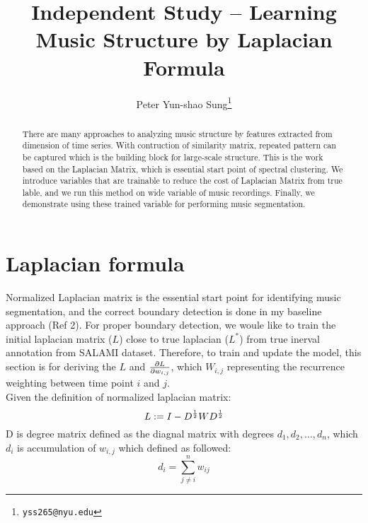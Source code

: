 \documentclass[final]{siamltexmm}
\title{Independent Study -- Learning Music Structure by Laplacian Formula}
\author{Peter Yun-shao Sung\thanks{\tt yss265@nyu.edu} }
\begin{document}
\maketitle

\begin{abstract}
There are many approaches to analyzing music structure by features extracted from dimension of time series. With contruction of similarity matrix, repeated pattern can be captured which is the building block for large-scale structure. This is the work based on the Laplacian Matrix, which is essential start point of spectral clustering. We introduce variables that are trainable to reduce the cost of Laplacian Matrix from true lable, and we run this method on wide variable of music recordings. Finally, we demonstrate using these trained variable for performing music segmentation.
\end{abstract}

\pagestyle{myheadings}
\thispagestyle{plain}
\section{Laplacian formula}
Normalized Laplacian matrix is the essential start point for identifying music segmentation, and the correct boundary detection is done in my baseline approach (Ref 2). For proper boundary detection, we woule like to train the initial laplacian matrix ($L$) close to true laplacian ($L^{\ast}$) from true inerval annotation from SALAMI dataset. Therefore, to train and update the model, this section is for deriving the $L$ and ${\partial L \over \partial w_{i,j}}$, which $W_{i,j}$ representing the recurrence weighting between time point $i$ and $j$.\\
Given the definition of normalized laplacian matrix:
\begin{equation}
L := I - D^{1 \over 2}W D^{1 \over 2}
\end{equation}
D is degree matrix defined as the diagnal matrix with degrees $d_1, d_2, \ldots, d_n$, which $d_i$ is accumulation of $w_{i,j}$ which defined as followed:
\begin{equation}
d_i = \displaystyle\sum_{j \neq i}^{n} w_{ij}
\end{equation}
\end{document}
